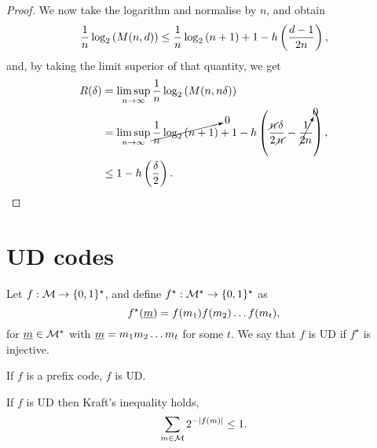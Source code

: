 \begin{proof}
	We now take the logarithm and normalise by $n$, and obtain
	\begin{equation*}
		\frac{1}{n} \log_2 \left( M(n, d) \right)
		\le
		\frac{1}{n} \log_2 \left( n+1 \right) + 1 - h\left({\frac{d-1}{2n}}\right),
	\end{equation*}
	and, by taking the limit superior of that quantity, we get
	\begin{align*}
		R(\delta)
		& =
		\limsup_{n \to \infty} \frac{1}{n} \log_2 \left( {M(n, n \delta)} \right)
		\\
		& =
		\limsup_{n \to \infty}
		\cancelto{0}{
			\frac{1}{n} \log_2 \left( {n+1} \right)
		}
		+ 1 - h\left({
			\frac{\cancel{n} \, \delta}{2 \, \cancel{n}}
			- \cancelto{0}{\frac{1}{2n}}
		}\right),
		\\
		& \le
		1 - h\left({\frac{\delta}{2}}\right). \qedhere
	\end{align*}
\end{proof}

\section{\acl{UD} codes}

\begin{definition}
	Let $f : \mathcal{M} \to \{0,1\}^{\star}$, and define $f^{\star} : \mathcal{M}^{\star} \to \{0,1\}^{\star}$ as
	\begin{equation*}
		f^{\star} (\underline{m}) = f(m_1) f(m_2) \dots f(m_t),
	\end{equation*}
	for $\underline{m} \in \mathcal{M}^{\star}$ with $\underline{m} = m_1 m_2 \dots m_t$ for some $t$.
	We say that $f$ is \ac{UD} if $f^{\star}$ is injective.
\end{definition}
If $f$ is a prefix code, $f$ is \ac{UD}.

\begin{thm}
	If $f$ is \ac{UD} then Kraft's inequality holds, \ie
	\begin{equation*}
		\sum_{m \in \mathcal{M}} 2^{-\left|{f(m)}\right|} \le 1.
	\end{equation*}
\end{thm}

